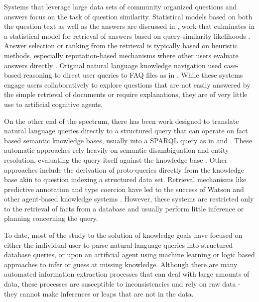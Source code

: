 \documentclass[11pt,letterpaper]{article}
\begin{document}
Systems that leverage large data sets of community organized questions and answers focus on the task of question similarity. Statistical models based on both the question text as well as the answers are discussed in \cite{jeon_finding_2005,jeon_finding_2005-1}, work that culminates in a statistical model for retrieval of answers based on query-similarity likelihoods \cite{xue_retrieval_2008}. Answer selection or ranking from the retrieval is typically based on heuristic methods, especially reputation-based mechanisms where other users evaluate answers directly \cite{wang_wisdom_2013}. Original natural language knowledge navigation used case-based reasoning to direct user queries to FAQ files as in \cite{hammond_faq_1995,burke_question_1997,burke_natural_1997}. While these systems engage users collaboratively to explore questions that are not easily answered by the simple retrieval of documents or require explanations, they are of very little use to artificial cognitive agents.

On the other end of the spectrum, there has been work designed to translate natural language queries directly to a structured query that can operate on fact based semantic knowledge bases, usually into a SPARQL query as in \cite{yahya_natural_2012,unger_template-based_2012} and \cite{berant_semantic_2013}. These automatic approaches rely heavily on semantic disambiguation and entity resolution, evaluating the query itself against the knowledge base \cite{zheng_entity_2012}. Other approaches include the derivation of proto-queries directly from the knowledge base \cite{frank_question_2007} akin to question indexing a structured data set. Retrieval mechanisms like predictive annotation and type coercion have led to the success of Watson and other agent-based knowledge systems \cite{prager_question_2006,kalyanpur_leveraging_2011}. However, these systems are restricted only to the retrieval of facts from a database and usually perform little inference or planning concerning the query.

To date, most of the study to the solution of knowledge goals have focused on either the individual user to parse natural language queries into structured database queries, or upon an artificial agent using machine learning or logic based approaches to infer or guess at missing knowledge. Although there are many automated information extraction processes that can deal with large amounts of data, these processes are susceptible to inconsistencies and rely on raw data - they cannot make inferences or leaps that are not in the data.
\end{document}
